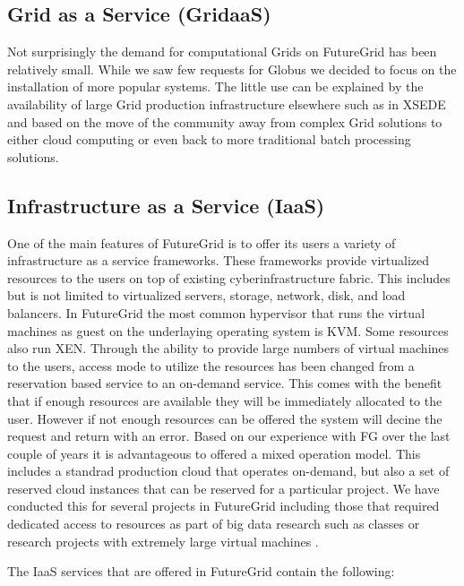 \documentclass{article}
\begin{document}
\subsection{Grid as a Service (GridaaS)}

Not surprisingly the demand for computational Grids on FutureGrid has been relatively small. While we saw few requests for Globus we decided to focus on the installation of more popular systems. The little use can be explained by the availability of large Grid production infrastructure elsewhere such as in XSEDE and based on the move of the community away from complex Grid solutions to either cloud computing or even back to more traditional batch processing solutions.


\subsection{Infrastructure as a Service (IaaS)}

One of the main features of FutureGrid is to offer its users a variety of infrastructure as a service frameworks. These frameworks provide virtualized resources to the users on top of existing cyberinfrastructure fabric. This includes but is not limited to virtualized servers, storage, network, disk, and load balancers. In FutureGrid the most common hypervisor that runs the virtual machines as guest on the underlaying operating system is KVM. Some resources also run XEN. Through the ability to provide large numbers of virtual machines to the users, access mode to utilize the resources has been changed from a reservation based service to an on-demand service. This comes with the benefit that if enough resources are available they will be immediately allocated to the user. However if not enough resources can be offered the system will decine the request and return with an error. Based on our experience with FG over the last couple of years it is advantageous to offered a mixed operation model. This includes a standrad production cloud that operates on-demand, but also a set of reserved cloud instances that can be reserved for a particular project. We have conducted this for several projects in FutureGrid including those that required dedicated access to resources as part of big data research such as classes \cite{fg405,fg368} or research projects with extremely large virtual machines \cite{fg298}.

The IaaS services that are offered in FutureGrid contain the following:
\end{document}
